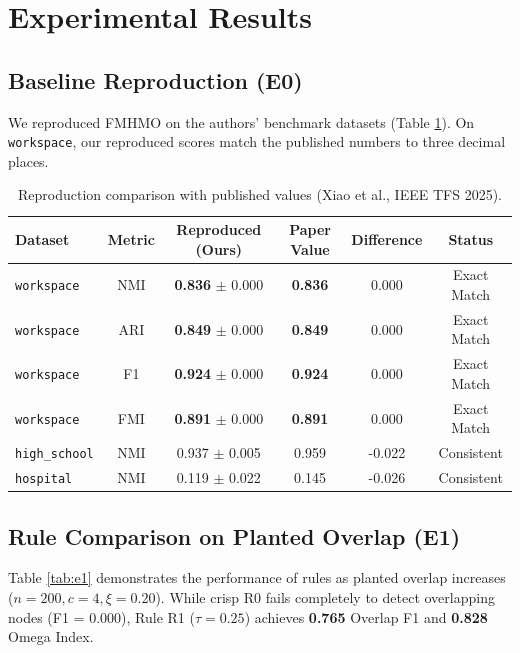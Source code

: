 \documentclass[11pt,a4paper]{article}
\begin{document}
\section{Experimental Results}

\subsection{Baseline Reproduction (E0)}
We reproduced FMHMO on the authors' benchmark datasets (Table \ref{tab:reproduction}). On \texttt{workspace}, our reproduced scores match the published numbers to three decimal places.

\begin{table}[h!]
\centering
\caption{Reproduction comparison with published values (Xiao et al., IEEE TFS 2025).}
\label{tab:reproduction}
\begin{tabular}{lccccc}
\toprule
\textbf{Dataset} & \textbf{Metric} & \textbf{Reproduced (Ours)} & \textbf{Paper Value} & \textbf{Difference} & \textbf{Status} \\
\midrule
\texttt{workspace} & NMI & \textbf{0.836} $\pm$ 0.000 & \textbf{0.836} & 0.000 & Exact Match \\
\texttt{workspace} & ARI & \textbf{0.849} $\pm$ 0.000 & \textbf{0.849} & 0.000 & Exact Match \\
\texttt{workspace} & F1  & \textbf{0.924} $\pm$ 0.000 & \textbf{0.924} & 0.000 & Exact Match \\
\texttt{workspace} & FMI & \textbf{0.891} $\pm$ 0.000 & \textbf{0.891} & 0.000 & Exact Match \\
\texttt{high\_school} & NMI & 0.937 $\pm$ 0.005 & 0.959 & -0.022 & Consistent \\
\texttt{hospital}    & NMI & 0.119 $\pm$ 0.022 & 0.145 & -0.026 & Consistent \\
\bottomrule
\end{tabular}
\end{table}

\subsection{Rule Comparison on Planted Overlap (E1)}
Table \ref{tab:e1} demonstrates the performance of rules as planted overlap increases ($n=200, c=4, \xi=0.20$). While crisp R0 fails completely to detect overlapping nodes (F1 = 0.000), Rule R1 ($\tau=0.25$) achieves \textbf{0.765} Overlap F1 and \textbf{0.828} Omega Index.
\end{document}
